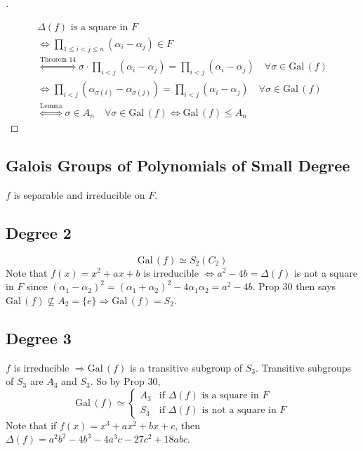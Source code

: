 \documentclass{article}
\theoremstyle{definition}
\newenvironment{proofs}[1][\proofname]{%
  \begin{proof}[#1]$ $\par\nobreak\ignorespaces
}{%
  \end{proof}
}
\newcommand{\Ra}{\Rightarrow}
\newcommand{\Lra}{\Leftrightarrow}
\newcommand{\Gal}{\text{Gal}\,}
\begin{document}
\begin{proofs}
	\begin{gather*}
		\Delta (f) \text{ is a square in } F \\
		\Lra \prod_{1 \leq i < j \leq n} (\alpha_i - \alpha_j) \in F\\ 
		\stackrel{\text{Theorem 14}}{\Lra} \sigma \cdot \prod_{i < j} (\alpha_i - \alpha_j) = \prod_{i < j} (\alpha_i - \alpha_j) \quad \forall \sigma \in \Gal(f)\\
		\Lra  \prod_{i < j} (\alpha_{\sigma(i)} - \alpha_{\sigma(j)}) = \prod_{i < j} (\alpha_i - \alpha_j) \quad \forall \sigma \in \Gal(f)\\
		\stackrel{\text{Lemma}}{\Lra} \sigma \in A_n \quad \forall \sigma \in \Gal(f) \Lra \Gal(f) \leq A_n
	\end{gather*}
\end{proofs}

\subsection*{Galois Groups of Polynomials of Small Degree}

$f$ is separable and irreducible on $F$.

\subsection*{Degree 2}
\[
	\Gal(f) \simeq S_2 (C_2)
\]
Note that $f(x) = x^2 + ax + b$ is irreducible $\Lra a^2 - 4b = \Delta(f)$ is not a square in $F$ since $(\alpha_1 - \alpha_2)^2 = (\alpha_1 + \alpha_2)^2 - 4 \alpha_1 \alpha_2 = a^2 - 4b$.
Prop 30 then says $\Gal(f) \nsubseteq A_2 = \{e\} \Ra \Gal(f) = S_2$.

\subsection*{Degree 3}
$f$ is irreducible $\Ra \Gal(f)$ is a transitive subgroup of $S_3$.
Transitive subgroups of $S_3$ are $A_3$ and $S_3$.
So by Prop 30, 
\[
	\Gal(f) \simeq
	\begin{cases}
		A_3 & \text{if } \Delta(f) \text{ is a square in }F\\
		S_3 & \text{if } \Delta(f) \text{ is not a square in }F
	\end{cases}
\]
Note that if $f(x) = x^3 + ax^2 + bx + c$, then $\Delta(f) = a^2 b^2 - 4 b^3 - 4 a^3 c - 27c^2 + 18 abc$.
\end{document}
